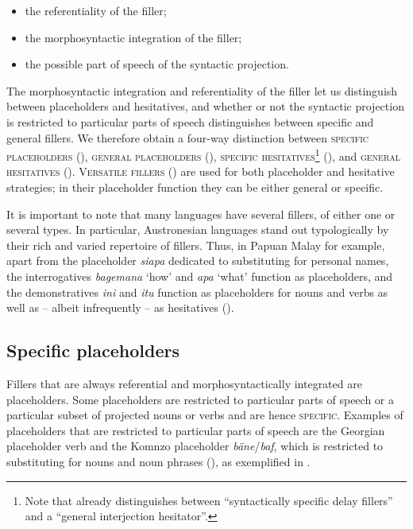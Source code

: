 \documentclass[output=paper]{langscibook}
\begin{document}
\begin{itemize}
\item the referentiality of the filler;
\item the morphosyntactic integration of the filler;
\item the possible part of speech of the syntactic projection.
\end{itemize}

The morphosyntactic integration and referentiality of the filler let us distinguish between placeholders and hesitatives, and whether or not the syntactic projection is restricted to particular parts of speech distinguishes between specific and general fillers. We therefore obtain a four-way distinction between \textsc{specific} \textsc{placeholders} (), \textsc{general} \textsc{placeholders} (), \textsc{specific} \textsc{hesitatives}\footnote{ Note that \citet[136]{Dimock2010} already distinguishes between “syntactically specific delay fillers” and a “general interjection hesitator”.} (), and \textsc{general} \textsc{hesitatives} (). \textsc{Versatile} \textsc{fillers} () are used for both placeholder and hesitative strategies; in their placeholder function they can be either general or specific.   

It is important to note that many languages have several fillers, of either one or several types. In particular, Austronesian languages stand out typologically by their rich and varied repertoire of fillers. Thus, in Papuan Malay for example, apart from the placeholder \textit{siapa} dedicated to substituting for personal names, the interrogatives \textit{bagemana} ‘how’ and \textit{apa} ‘what’ function as placeholders, and the demonstratives \textit{ini} and \textit{itu} function as placeholders for nouns and verbs as well as – albeit infrequently – as hesitatives (\citealt[288--297, 388--389]{Kluge2017}).

\subsection{Specific placeholders}\label{sec:intro:4.1}

Fillers that are always referential and morphosyntactically integrated are placeholders. Some placeholders are restricted to particular parts of speech or a particular subset of projected nouns or verbs and are hence \textsc{specific}. Examples of placeholders that are restricted to particular parts of speech are the Georgian placeholder verb \citep{AmiridzeGeorgian2010} and the Komnzo placeholder \textit{bäne}/\textit{baf}, which is restricted to substituting for nouns and noun phrases (\citealt{chapters/doehler}), as exemplified in .
\end{document}
